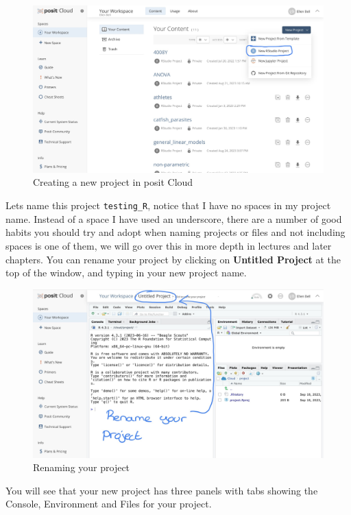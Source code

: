 \documentclass[
]{book}
\begin{document}
\begin{figure}
\includegraphics[width=0.9\linewidth]{figures/posit2} \caption{Creating a new project in posit Cloud}\label{fig:unnamed-chunk-2}
\end{figure}

Lets name this project \texttt{testing\_R}, notice that I have no spaces in my project name. Instead of a space I have used an underscore, there are a number of good habits you should try and adopt when naming projects or files and not including spaces is one of them, we will go over this in more depth in lectures and later chapters. You can rename your project by clicking on \textbf{Untitled Project} at the top of the window, and typing in your new project name.

\begin{figure}
\includegraphics[width=0.9\linewidth]{figures/posit3} \caption{Renaming your project}\label{fig:unnamed-chunk-3}
\end{figure}

You will see that your new project has three panels with tabs showing the Console, Environment and Files for your project.
\end{document}
